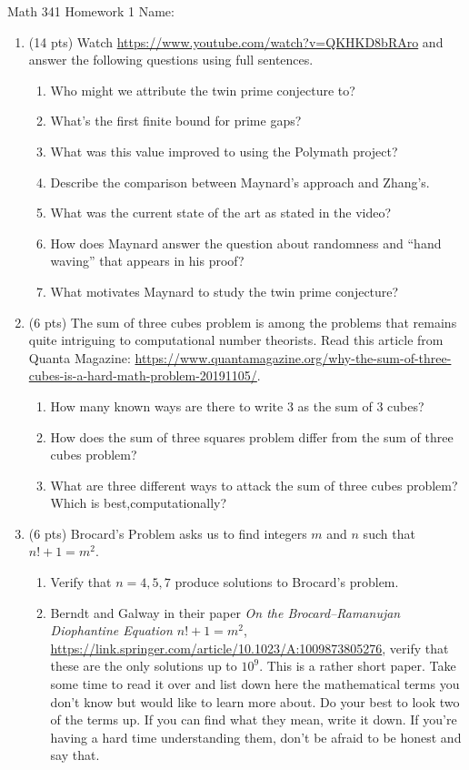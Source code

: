 \documentclass[12pt]{article}
\begin{document}
	Math 341 Homework 1
	\hfill
	Name: \underline{\hspace*{2in}}
	\begin{enumerate}
	\item (14 pts) Watch \url{https://www.youtube.com/watch?v=QKHKD8bRAro} and answer the following questions using full sentences.	
		\begin{enumerate}
			\item Who might we attribute the twin prime conjecture to?
				\vfill
			\item What's the first finite bound for prime gaps?
				\vfill
			\item What was this value improved to using the Polymath project?
				\vfill
			\item Describe the comparison between Maynard's approach and Zhang's.
				\vfill
			\item What was the current state of the art as stated in the video?
				\vfill
			\item How does Maynard answer the question about randomness and ``hand waving'' that appears in his proof?
				\vfill
			\item What motivates Maynard to study the twin prime conjecture?
				\vfill
		\end{enumerate}
	\newpage
	\item (6 pts) The sum of three cubes problem is among the problems that remains quite intriguing to computational number theorists. Read this article from Quanta Magazine: {\footnotesize\url{https://www.quantamagazine.org/why-the-sum-of-three-cubes-is-a-hard-math-problem-20191105/}}.  
		\begin{enumerate}
			\item How many known ways are there to write 3 as the sum of 3 cubes?
			\vskip 1in
			\item How does the sum of three squares problem differ from the sum of three cubes problem?
			\vskip 1in
			\item What are three different ways to attack the sum of three cubes problem? Which is best,computationally?
			\vskip 1in
		\end{enumerate}
	\item (6 pts) Brocard's Problem asks us to find integers $m$ and $n$ such that $n!+1=m^2$.
		\begin{enumerate}
			\item Verify that $n=4,5,7$ produce solutions to Brocard's problem.
				\vskip 1in
			\item Berndt and Galway in their paper \textit{On the Brocard--Ramanujan Diophantine Equation $n!+1=m^2$}, \url{https://link.springer.com/article/10.1023/A:1009873805276}, verify that these are the only solutions up to $10^9$.  This is a rather short paper. Take some time to read it over and list down here the mathematical terms you don't know but would like to learn more about.  Do your best to look two of the terms up.  If you can find what they mean, write it down.  If you're having a hard time understanding them, don't be afraid to be honest and say that.

\end{enumerate}
\end{enumerate}
\end{document}

